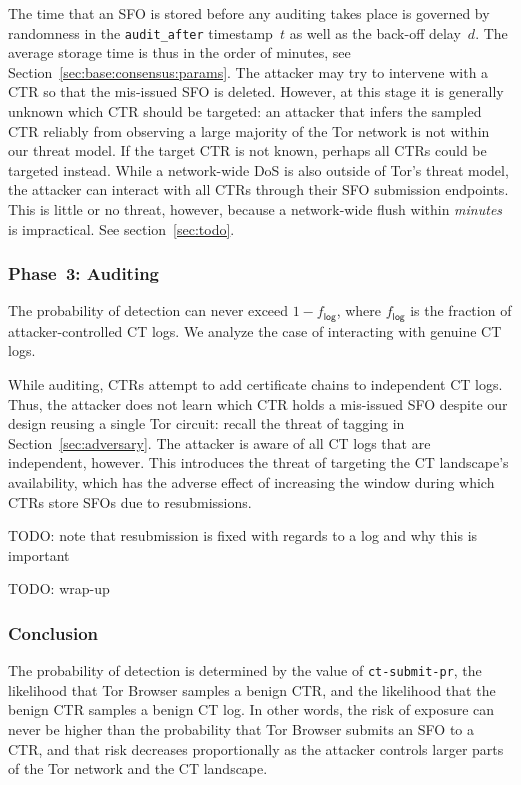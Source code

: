 The time that an SFO is stored before any auditing takes place is governed by
randomness in the \texttt{audit\_after} timestamp~$t$ as well as the back-off
delay~$d$.  The average storage time is thus in the order of minutes, see
Section~\ref{sec:base:consensus:params}.  The attacker may try to intervene with
a CTR so that the mis-issued SFO is deleted.  However, at this stage it is
generally unknown which CTR should be targeted:
	an attacker that infers the sampled CTR reliably from observing a large
	majority of the Tor network is not within our threat model.
If the target CTR is not known, perhaps all CTRs could be targeted instead.
While a network-wide DoS is also outside of Tor's threat model, the attacker can
interact with all CTRs through their SFO submission endpoints.  This is little
or no threat, however, because a network-wide flush within \emph{minutes} is
impractical.  See section~\ref{sec:todo}.

\subsubsection{Phase~3: Auditing} \label{sec:analysis:pr:phase3}
The probability of detection can never exceed $1-f_{\mathsf{log}}$, where
$f_{\mathsf{log}}$ is the fraction of attacker-controlled CT logs.  We analyze
the case of interacting with genuine CT logs.

While auditing, CTRs attempt to add certificate chains to independent CT logs.
Thus, the attacker does not learn which CTR holds a mis-issued SFO despite
our design reusing a single Tor circuit:
	recall the threat of tagging in Section~\ref{sec:adversary}.
The attacker is aware of all CT logs that are independent, however.  This
introduces the threat of targeting the CT landscape's availability, which has
the adverse effect of increasing the window during which CTRs store SFOs
due to resubmissions.

TODO: note that resubmission is fixed with regards to a log and why this is
important

TODO: wrap-up

\subsubsection{Conclusion}
The probability of detection is determined by 
	the value of \texttt{ct-submit-pr},
	the likelihood that Tor Browser samples a benign CTR, and
	the likelihood that the benign CTR samples a benign CT log.
In other words, the risk of exposure can never be higher than the probability
that Tor Browser submits an SFO to a CTR, and that risk decreases proportionally
as the attacker controls larger parts of the Tor network and the CT landscape.

